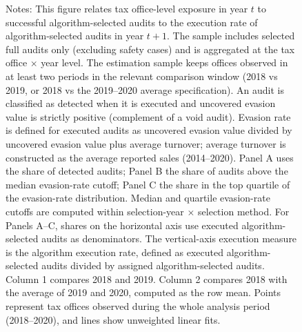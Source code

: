\documentclass{article}
\begin{document}
\begin{figure}[H]
\begin{threeparttable}
\begin{tablenotes}
    \footnotesize \item Notes: This figure relates tax office-level exposure in year $t$ to successful algorithm-selected audits to the execution rate of algorithm-selected audits in year $t+1$. The sample includes selected full audits only (excluding safety cases) and is aggregated at the tax office $\times$ year level. The estimation sample keeps offices observed in at least two periods in the relevant comparison window (2018 vs 2019, or 2018 vs the 2019--2020 average specification). An audit is classified as detected when it is executed and uncovered evasion value is strictly positive (complement of a void audit). Evasion rate is defined for executed audits as uncovered evasion value divided by uncovered evasion value plus average turnover; average turnover is constructed as the average reported sales (2014--2020). Panel A uses the share of detected audits; Panel B the share of audits above the median evasion-rate cutoff; Panel C the share in the top quartile of the evasion-rate distribution. Median and quartile evasion-rate cutoffs are computed within selection-year $\times$ selection method. For Panels A--C, shares on the horizontal axis use executed algorithm-selected audits as denominators. The vertical-axis execution measure is the algorithm execution rate, defined as executed algorithm-selected audits divided by assigned algorithm-selected audits. Column 1 compares 2018 and 2019. Column 2 compares 2018 with the average of 2019 and 2020, computed as the row mean. Points represent tax offices observed during the whole analysis period (2018--2020), and lines show unweighted linear fits.
    \end{tablenotes}
    \end{threeparttable}
\end{figure}
\end{document}
